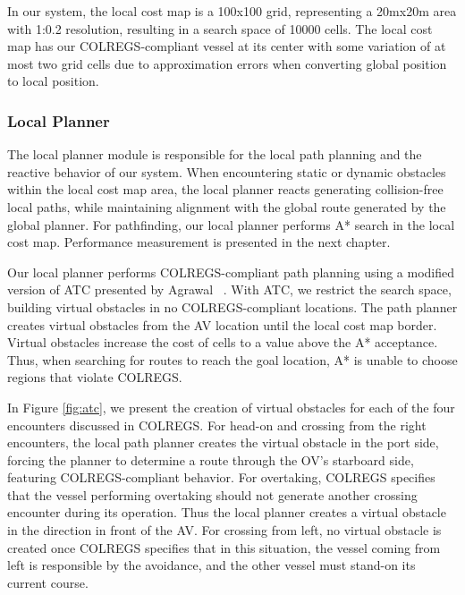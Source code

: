         In our system, the local cost map is a 100x100 grid, representing a 20mx20m area with 1:0.2 resolution, resulting in a search space of 10000 cells. The local cost map has our \ac{COLREGS}-compliant vessel at its center with some variation of at most two grid cells due to approximation errors when converting global position to local position.

        \subsubsection{Local Planner}
        \label{sec:local_planner}
        
            The local planner module is responsible for the local path planning and the reactive behavior of our system. When encountering static or dynamic obstacles within the local cost map area, the local planner reacts generating collision-free local paths, while maintaining alignment with the global route generated by the global planner. For pathfinding, our local planner performs A* search in the local cost map. Performance measurement is presented in the next chapter.
            
            Our local planner performs \ac{COLREGS}-compliant path planning using a modified version of \ac{ATC} presented by Agrawal \etal~\cite{Agrawal2015COLREGS}. With \ac{ATC}, we restrict the search space, building virtual obstacles in no \ac{COLREGS}-compliant locations. The path planner creates virtual obstacles from the \ac{AV} location until the local cost map border. Virtual obstacles increase the cost of cells to a value above the A* acceptance. Thus, when searching for routes to reach the goal location, A* is unable to choose regions that violate \ac{COLREGS}.
            
            In Figure \ref{fig:atc}, we present the creation of virtual obstacles for each of the four encounters discussed in \ac{COLREGS}. For head-on and crossing from the right encounters, the local path planner creates the virtual obstacle in the port side, forcing the planner to determine a route through the \ac{OV}'s starboard side, featuring \ac{COLREGS}-compliant behavior. For overtaking, \ac{COLREGS} specifies that the vessel performing overtaking should not generate another crossing encounter during its operation. Thus the local planner creates a virtual obstacle in the direction in front of the \ac{AV}. For crossing from left, no virtual obstacle is created once \ac{COLREGS} specifies that in this situation, the vessel coming from left is responsible by the avoidance, and the other vessel must stand-on its current course.
            
